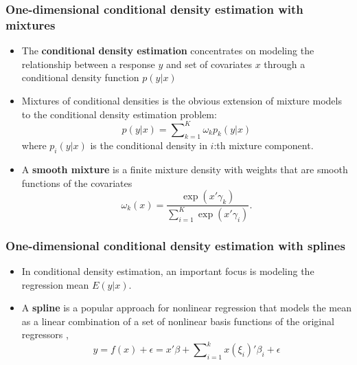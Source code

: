 \documentclass[11pt]{beamer}
\begin{document}
\begin{frame}
  \frametitle{One-dimensional conditional density estimation with mixtures}

  \begin{itemize}
  \item The \textbf{conditional density estimation} concentrates on modeling the
    relationship between a response $y$ and set of covariates $x$ through a
    conditional density function $p(y|x)$

  \item Mixtures of conditional densities is the obvious extension of mixture
    models to the conditional density estimation problem:
    \[
    p(y|x)=\sum\nolimits _{k=1}^{K}\omega_{k}p_{k}(y|x)
    \]
    where $p_{i}(y|x)$ is the conditional density in $i$:th mixture component.

  \item A \textbf{smooth mixture} is a finite mixture density with weights that
    are smooth functions of the covariates
    \[
    \omega_{k}(x)=\frac{\exp(x'\gamma_{k})}{\sum_{i=1}^{K}\exp(x'\gamma_{i})}.
    \]
  \end{itemize}

\end{frame}



\begin{frame}
  \frametitle{One-dimensional conditional density estimation with splines}

  \begin{itemize}
  \item In conditional density estimation, an important focus is modeling
    the regression mean $E(y|x)$.

  \item A \textbf{spline} is a popular approach for nonlinear regression that
    models the mean as a linear combination of a set of nonlinear basis
    functions of the original regressors \citep{holmes2003generalized},
    \[
    y=f(x)+\epsilon=x'\beta+\sum\nolimits _{i=1}^{k}x(\xi_{i})'\beta_{i}+\epsilon
    \]

  \end{itemize}
\end{frame}
\end{document}
